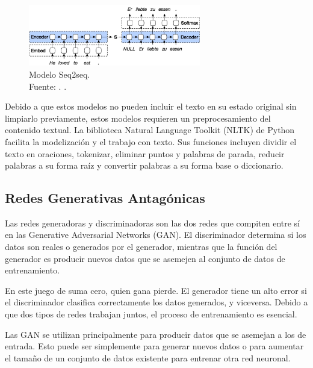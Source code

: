 \begin{itemize}
	\begin{figure}[!ht]
		\begin{center}
			\includegraphics[width=0.67\textwidth]{2/figures/encoder-decoder.jpg}
			\caption[Modelo Seq2seq]{Modelo Seq2seq.\\
			Fuente: \cite{tec_kostadinov2019seq2seq}. .}
			\label{2:fig46}
		\end{center}
	\end{figure}	
\end{itemize}

Debido a que estos modelos no pueden incluir el texto en su estado original sin limpiarlo previamente, estos modelos requieren un preprocesamiento del contenido textual. La biblioteca Natural Language Toolkit (NLTK) de Python facilita la modelización y el trabajo con texto. Sus funciones incluyen dividir el texto en oraciones, tokenizar, eliminar puntos y palabras de parada, reducir palabras a su forma raíz y convertir palabras a su forma base o diccionario. \parencite{bk_brownlee2017deeplearning_nlp}

\subsection{Redes Generativas Antagónicas}

Las redes generadoras y discriminadoras son las dos redes que compiten entre sí en las Generative Adversarial Networks (GAN). El discriminador determina si los datos son reales o generados por el generador, mientras que la función del generador es producir nuevos datos que se asemejen al conjunto de datos de entrenamiento. \parencite{tec_goodfellow2014gan}

En este juego de suma cero, quien gana pierde. El generador tiene un alto error si el discriminador clasifica correctamente los datos generados, y viceversa. Debido a que dos tipos de redes trabajan juntos, el proceso de entrenamiento es esencial. \parencite{tec_goodfellow2014gan}

Las GAN se utilizan principalmente para producir datos que se asemejan a los de entrada. Esto puede ser simplemente para generar nuevos datos o para aumentar el tamaño de un conjunto de datos existente para entrenar otra red neuronal. \parencite{tec_goodfellow2014gan}

